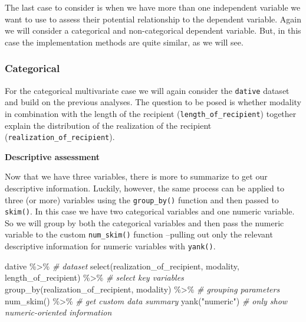 \documentclass[
]{article}
\newenvironment{Shaded}{\begin{snugshade}}{\end{snugshade}}
\newcommand{\CommentTok}[1]{\textcolor[rgb]{0.56,0.35,0.01}{\textit{#1}}}
\newcommand{\FunctionTok}[1]{\textcolor[rgb]{0.00,0.00,0.00}{#1}}
\newcommand{\NormalTok}[1]{#1}
\newcommand{\SpecialCharTok}[1]{\textcolor[rgb]{0.00,0.00,0.00}{#1}}
\newcommand{\StringTok}[1]{\textcolor[rgb]{0.31,0.60,0.02}{#1}}
\begin{document}
The last case to consider is when we have more than one independent variable we want to use to assess their potential relationship to the dependent variable. Again we will consider a categorical and non-categorical dependent variable. But, in this case the implementation methods are quite similar, as we will see.

\hypertarget{categorical-2}{%
\subsubsection{Categorical}\label{categorical-2}}

For the categorical multivariate case we will again consider the \texttt{dative} dataset and build on the previous analyses. The question to be posed is whether modality in combination with the length of the recipient (\texttt{length\_of\_recipient}) together explain the distribution of the realization of the recipient (\texttt{realization\_of\_recipient}).

\textbf{Descriptive assessment}

Now that we have three variables, there is more to summarize to get our descriptive information. Luckily, however, the same process can be applied to three (or more) variables using the \texttt{group\_by()} function and then passed to \texttt{skim()}. In this case we have two categorical variables and one numeric variable. So we will group by both the categorical variables and then pass the numeric variable to the custom \texttt{num\_skim()} function --pulling out only the relevant descriptive information for numeric variables with \texttt{yank()}.

\begin{Shaded}
\begin{Highlighting}[]
\NormalTok{dative }\SpecialCharTok{\%\textgreater{}\%} \CommentTok{\# dataset}
  \FunctionTok{select}\NormalTok{(realization\_of\_recipient, modality, length\_of\_recipient) }\SpecialCharTok{\%\textgreater{}\%} \CommentTok{\# select key variables}
  \FunctionTok{group\_by}\NormalTok{(realization\_of\_recipient, modality) }\SpecialCharTok{\%\textgreater{}\%} \CommentTok{\# grouping parameters}
  \FunctionTok{num\_skim}\NormalTok{() }\SpecialCharTok{\%\textgreater{}\%} \CommentTok{\# get custom data summary}
  \FunctionTok{yank}\NormalTok{(}\StringTok{"numeric"}\NormalTok{) }\CommentTok{\# only show numeric{-}oriented information}
\end{Highlighting}
\end{Shaded}
\end{document}
